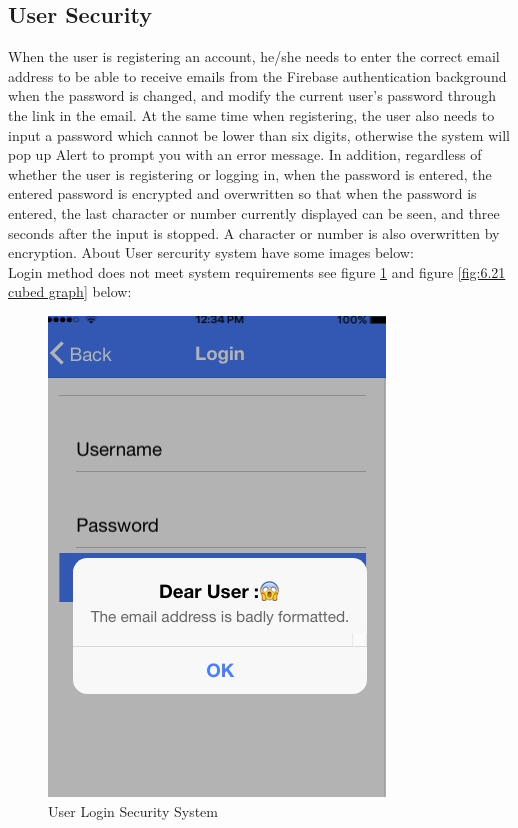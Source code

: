 \subsection{User Security}
When the user is registering an account, he/she needs to enter the correct email address to be able to receive emails from the Firebase authentication\cite{3} background when the password is changed, and modify the current user's password through the link in the email. At the same time when registering, the user also needs to input a password which cannot be lower than six digits, otherwise the system will pop up Alert to prompt you with an error message. In addition, regardless of whether the user is registering or logging in, when the password is entered, the entered password is encrypted and overwritten so that when the password is entered, the last character or number currently displayed can be seen, and three seconds after the input is stopped. A character or number is also overwritten by encryption. About User sercurity system have some images below:\\
Login method does not meet system requirements see figure \ref{fig:6.20 cubed graph} and figure \ref{fig:6.21 cubed graph}  below:
\begin{figure}[h]
	\centering
	\includegraphics[scale=0.5]{img/Ionicalert2.png}
	\caption{User Login Security System}
	\label{fig:6.20 cubed graph}
\end{figure}
